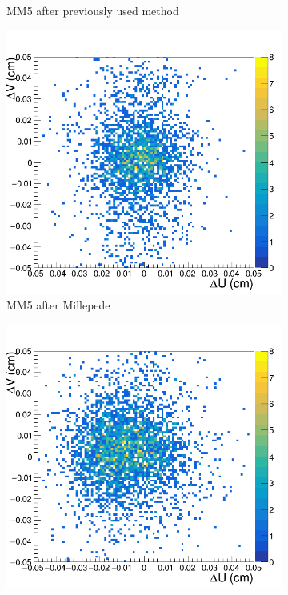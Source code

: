 \begin{figure}[h!]
\begin{subfigure}[l]{.45\textwidth}
   \caption{MM5 after previously used method}
   \label{fig:MX5_after_prev}
 \end{subfigure}
 \begin{subfigure}[r]{.45\textwidth}
   \centering
   \includegraphics[width=\linewidth]{thesis_figures/alignment/Run_3211_after_millepede/square/MX5.png}
   \caption{MM5 after Millepede}
 \end{subfigure}
 \begin{subfigure}[l]{.45\textwidth}
   \centering
   \includegraphics[width=\linewidth]{thesis_figures/alignment/Run_3211_after_prev/square/MX7.png}


\end{subfigure}
\end{figure}
